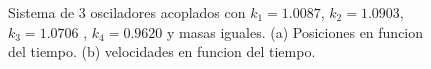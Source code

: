 \documentclass[11pt,letterpaper,twocolumn]{article}
\begin{document}
\begin{figure}[h!]
\begin{center}
\caption{Sistema de 3 osciladores acoplados con $k_{1}=1.0087$, $k_{2}=1.0903$, $k_{3}=1.0706$ , $k_{4}=0.9620$ y masas iguales. (a) Posiciones en funcion del tiempo. (b) velocidades en funcion del tiempo.}
\end{center}
\label{pos}
\end{figure}
\par 
\end{document}
